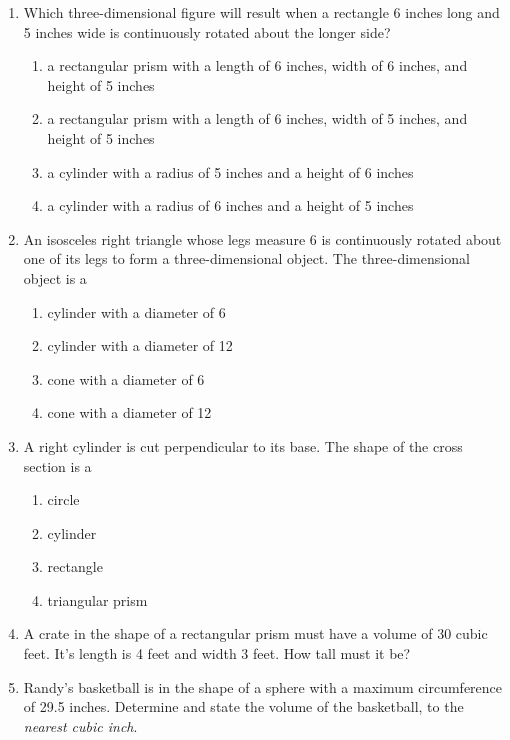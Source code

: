 \documentclass[12pt, twoside]{article}
\begin{document}
\begin{enumerate}
\newpage
\item Which three-dimensional figure will result when a rectangle 6 inches long and 5 inches wide is continuously rotated about the longer side?
    \begin{enumerate}
      \item a rectangular prism with a length of 6 inches, width of 6 inches, and height of 5 inches
      \item a rectangular prism with a length of 6 inches, width of 5 inches, and height of 5 inches
      \item a cylinder with a radius of 5 inches and a height of 6 inches
      \item a cylinder with a radius of 6 inches and a height of 5 inches
    \end{enumerate}

  \item An isosceles right triangle whose legs measure 6 is continuously rotated about one of its legs to form a three-dimensional object. The three-dimensional object is a
    \begin{enumerate}
      \item cylinder with a diameter of 6
      \item cylinder with a diameter of 12
      \item cone with a diameter of 6
      \item cone with a diameter of 12
    \end{enumerate}

  \item A right cylinder is cut perpendicular to its base. The shape of the cross section is a
    \begin{enumerate}
      \item circle
      \item cylinder
      \item rectangle
      \item triangular prism
    \end{enumerate} \vspace{2cm}

  \item A crate in the shape of a rectangular prism must have a volume of 30 cubic feet. It's length is 4 feet and width 3 feet. How tall must it be? \vspace{3.0cm}

\newpage
  \item Randy’s basketball is in the shape of a sphere with a maximum circumference of 29.5 inches. Determine and state the volume of the basketball, to the \emph{nearest cubic inch}. \vspace{4cm}
  

\end{enumerate}
\end{document}
